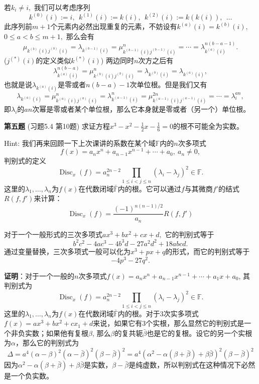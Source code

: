 若$k_i \neq i,$ 我们可以考虑序列
$$k^{(0)}(i) := i, ~~ k^{(1)}(i) := k(i), ~~ k^{(2)}(i) := k(k(i)), ~~ \ldots$$
此序列前$m+1$个元素内必然出现重复的元素，不妨设有$k^{(a)}(i) = k^{(b)}(i),$ $0 \leqslant a < b \leqslant m+1,$ 那么会有
$$\mu_{k^{(b)}(i)j^{(b)}(i)} = \lambda_{k^{(b-1)}(i)} = \mu_{k^{(b-1)}(i)j^{(b-1)}(i)}^n = \cdots = \lambda_{k^{(a)}(i)}^{n(b-a-1)}.$$
($j^{(*)}(i)$的定义类似$k^{(*)}(i)$) 两边同时$n$次方之后有
$$\lambda_{k^{(a)}(i)}^{n(b-a)} = \mu_{k^{(b)}(i)j^{(b)}(i)}^n = \lambda_{k^{(b)}(i)} = \lambda_{k^{(a)}(i)},$$
也就是说$\lambda_{k^{(a)}(i)}$是零或者$n(b-a) - 1$次单位根。但是我们又有
$$\lambda_{k^{(a)}(i)} = \mu_{k^{(a)}(i)j^{(a)}(i)}^n = \lambda_{k^{(a-1)}(i)}^n = \mu_{k^{(a-1)}(i)j^{(a-1)}(i)}^{2n} = \cdots = \lambda_{i}^{an},$$
即$\lambda_{i}$的$an$次幂是零或者某个单位根，那么它本身就是零或者（另一个）单位根。

\fi  %

\newpageorvspace

{\bf 第五题} (习题5.4 第10题) 求证方程$x^3 - x^2 - \frac{1}{2}x - \frac{1}{6} = 0$的根不可能全为实数。

\vspace{0.5em}

Hint: 我们再来回顾一下上次课讲的系数在某个域$\mathbb{F}$内的$n$次多项式
$$
f(x) = a_{n}x^{n} + a_{n-1}x^{n-1} + \cdots + a_{0}, ~ a_n \neq 0,
$$
判别式的定义
$$\operatorname{Disc}_x(f) = a_n^{2n-2} \prod_{1 \leqslant i < j \leqslant n} (\lambda_i - \lambda_j)^2 \in \mathbb{F}.$$
这里的$\lambda_1, \ldots, \lambda_n$为$f(x)$在代数闭域$\bar{\mathbb{F}}$内的根。它可以通过$f$与其微商$f'$的结式$R(f,f')$来计算：
$$\operatorname{Disc}_x(f) = \frac{(-1)^{n(n-1)/2}}{a_n} R(f,f')$$

对于一个一般形式的三次多项式$ax^3 + bx^2 + cx + d,$ 它的判别式等于
$$b^{2}c^{2}-4ac^{3}-4b^{3}d-27a^{2}d^{2}+18abcd.$$
通过变量替换，三次多项式一般可以化为$x^3 + px + q$的形式，而它的判别式等于
$$-4p^3 - 27q^2.$$

\ifIncludeAnswer

\newpageorvspace

{\bf 证明}：对于一个一般的$n$次多项式$f(x) = a_{n}x^{n}+a_{n-1}x^{n-1}+\cdots +a_{1}x+a_{0}$, 其判别式为
$$\operatorname{Disc}_x(f) = a_n^{2n-2} \prod_{1 \leqslant i < j \leqslant n} (\lambda_i - \lambda_j)^2 \in \mathbb{F}.$$
这里的$\lambda_1, \ldots, \lambda_n$为$f(x)$在代数闭域$\bar{\mathbb{F}}$内的根。对于3次实多项式$f(x) = ax^3+bx^2+cx_1+d$来说，如果它有3个实根，那么显然它的判别式是一个非负实数；如果他有复根$\beta$, 那么$\beta$的复共轭$\bar{\beta}$也是它的复根。设它的另一个实根为$\alpha$，那么它的判别式为
$$\Delta = a^4 (\alpha-\beta)^2(\alpha-\bar{\beta})^2(\beta-\bar{\beta})^2 = a^4 (\alpha^2-\alpha(\beta+\bar{\beta})+\beta\bar{\beta})^2 (\beta-\bar{\beta})^2$$
因为$\alpha^2-\alpha(\beta+\bar{\beta})+\beta\bar{\beta}$是实数，$\beta-\bar{\beta}$是纯虚数，所以判别式在这种情况下必然是一个负实数。

